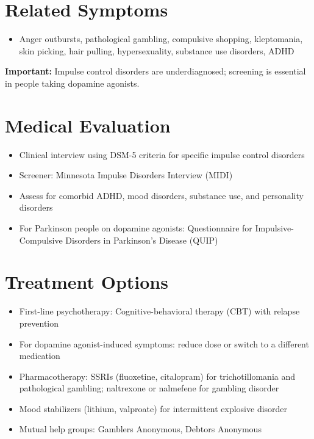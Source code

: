\section*{Related Symptoms}
\begin{itemize}
  \item Anger outbursts, pathological gambling, compulsive shopping, kleptomania, skin picking, hair pulling, hypersexuality, substance use disorders, ADHD
\end{itemize}
\textbf{Important:} Impulse control disorders are underdiagnosed; screening is essential in people taking dopamine agonists.

\section*{Medical Evaluation}
\begin{itemize}
  \item Clinical interview using DSM-5 criteria for specific impulse control disorders
  \item Screener: Minnesota Impulse Disorders Interview (MIDI)
  \item Assess for comorbid ADHD, mood disorders, substance use, and personality disorders
  \item For Parkinson people on dopamine agonists: Questionnaire for Impulsive-Compulsive Disorders in Parkinson's Disease (QUIP)
\end{itemize}

\section*{Treatment Options}
\begin{itemize}
  \item First-line psychotherapy: Cognitive-behavioral therapy (CBT) with relapse prevention
  \item For dopamine agonist-induced symptoms: reduce dose or switch to a different medication
  \item Pharmacotherapy: SSRIs (fluoxetine, citalopram) for trichotillomania and pathological gambling; naltrexone or nalmefene for gambling disorder
  \item Mood stabilizers (lithium, valproate) for intermittent explosive disorder
  \item Mutual help groups: Gamblers Anonymous, Debtors Anonymous
\end{itemize}

